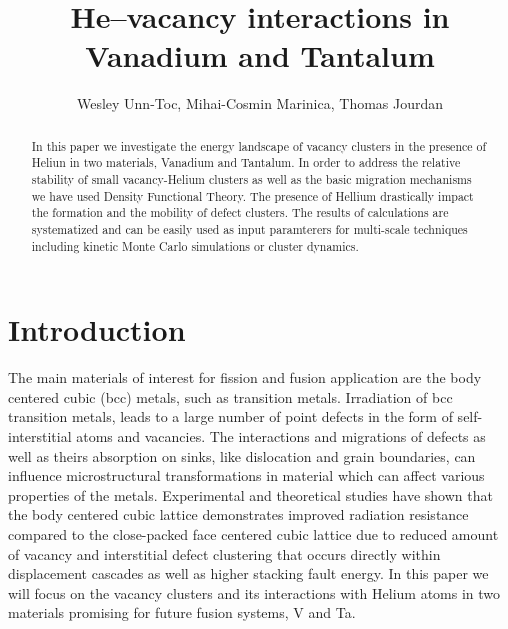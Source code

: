 \documentclass[a4,12pt,showpacs,preprintnumbers,amsmath,amssymb]{revtex4}
\begin{document}
\title{He--vacancy interactions in Vanadium and Tantalum}
\author{Wesley Unn-Toc, Mihai-Cosmin Marinica, Thomas Jourdan}
\date{}

\begin{abstract}
In this paper we investigate the energy landscape of vacancy clusters in the presence of Heliun in two materials, 
Vanadium and Tantalum. 
In order to address the relative stability of small vacancy-Helium clusters as well as the basic migration 
mechanisms we have used Density Functional Theory. The presence of Hellium drastically impact the formation and the mobility of 
defect clusters.  
%
The results of calculations are systematized and can be easily used as input paramterers 
for multi-scale techniques including kinetic Monte Carlo simulations or cluster dynamics.
\end{abstract}


 \maketitle
 
\section{Introduction}

The main materials of interest for  fission and fusion application are the body centered cubic (bcc) metals, 
such as transition metals. 
%
Irradiation of bcc transition metals, leads to a large number of point defects in the form of self-interstitial 
atoms and vacancies. The interactions and migrations of defects as well as theirs absorption on sinks, 
like dislocation and grain boundaries, can influence microstructural transformations in material 
which can affect various properties of the metals. 
%
Experimental and theoretical studies \cite{Zinkle2013} have shown that the body centered cubic lattice demonstrates 
improved radiation resistance compared to the close-packed face centered cubic lattice due to reduced amount of 
vacancy and interstitial defect clustering that occurs directly within displacement cascades as well as 
higher stacking fault energy.
In this paper we will focus on the vacancy clusters and its interactions with Helium atoms in two materials promising 
for future fusion systems, V and Ta.   
\end{document}
